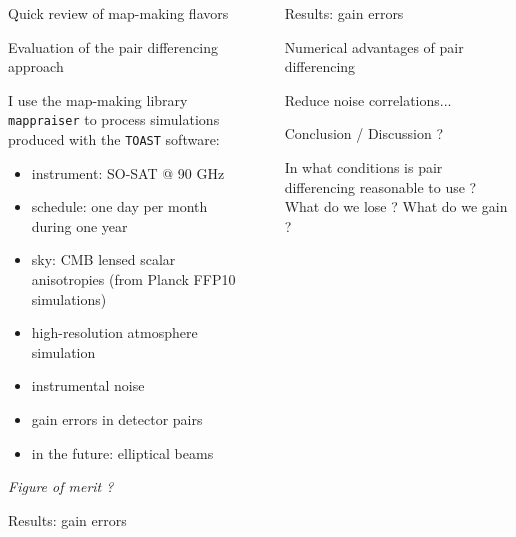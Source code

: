 \documentclass[final]{beamer}
\newlength{\sepwidth}
\newlength{\colwidth}
\newcommand{\separatorcolumn}{\begin{column}{\sepwidth}\end{column}}
\begin{document}
\begin{frame}[t]
\begin{columns}[t]
\begin{column}{\colwidth}
\begin{alertblock}{Quick review of map-making flavors}
      \end{alertblock}

      \begin{block}{Evaluation of the pair differencing approach}

        I use the map-making library \texttt{mappraiser}\cite{ElBouhargani:2021umq} to process simulations produced with the \texttt{TOAST} software:
        \begin{itemize}
          \item instrument: SO-SAT @ 90 GHz
          \item schedule: one day per month during one year
          \item sky: CMB lensed scalar anisotropies (from Planck FFP10 simulations)
          \item high-resolution atmosphere simulation
          \item instrumental noise
          \item gain errors in detector pairs
          \item in the future: elliptical beams
        \end{itemize}

        \emph{Figure of merit ?}

      \end{block}

      \begin{block}{Results: gain errors}

      \end{block}

    \end{column}

    \separatorcolumn

    \begin{column}{\colwidth}

      \begin{block}{Results: gain errors}

      \end{block}

      \begin{exampleblock}{Numerical advantages of pair differencing}

        Reduce noise correlations...

      \end{exampleblock}

      \begin{block}{Conclusion / Discussion ?}

        In what conditions is pair differencing reasonable to use ?
        What do we lose ? What do we gain ?


\end{block}
\end{column}
\end{columns}
\end{frame}
\end{document}
